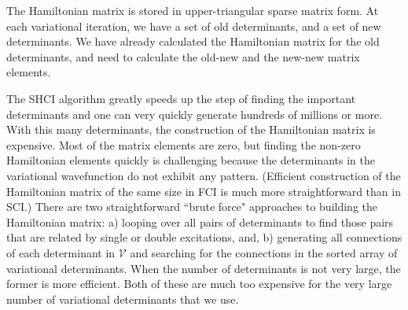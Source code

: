 \documentclass[%
reprint,
 superscriptaddress,
 amsmath,amssymb,
 aps,
]{revtex4-1}
\def\V{\mathcal{V}}
\begin{document}
The Hamiltonian matrix is stored in upper-triangular sparse matrix form.
At each variational iteration, we have a set of old determinants, and a set of new determinants.
We have already calculated the Hamiltonian matrix for the old determinants, and need to calculate the old-new and the new-new
matrix elements.

The SHCI algorithm greatly speeds up the step of finding the important determinants and one can very quickly generate
hundreds of millions or more.  With this many determinants, the construction of the Hamiltonian matrix is expensive.
Most of the matrix elements are zero, but finding the non-zero Hamiltonian elements quickly is challenging because
the determinants in the variational wavefunction do not exhibit any pattern.
(Efficient construction of the Hamiltonian matrix of the same size in FCI is much more straightforward than in SCI.)
There are two straightforward ``brute force" approaches to building the Hamiltonian matrix:
a) looping over all pairs of determinants to find those pairs that are related by single or double excitations, and, b)
generating all connections of each determinant in $\V$ and searching for the connections in the sorted array of variational determinants.
When the number of determinants is not very large, the former is more efficient.
Both of these are much too expensive for the very large number of variational determinants that we use.
\end{document}
